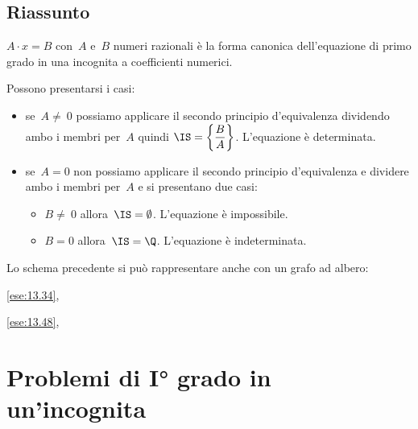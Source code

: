 \subsection{Riassunto}
\(A\cdot x=B\) con~\(A\) e~\(B\) numeri
razionali è la forma canonica dell'equazione di primo grado in una
incognita a coefficienti numerici.%

Possono presentarsi i casi:
\begin{itemize} [nosep]
 \item se~\(A\neq~0\) possiamo applicare il secondo principio
d'equivalenza dividendo ambo i membri per~\(A\) quindi
\(\IS =\left\{\dfrac{B}{A}\right\}\). L'equazione è determinata.
 \item se~\(A=0\) non possiamo applicare il secondo principio
d'equivalenza e dividere ambo i membri per~\(A\) e si
presentano due casi:
\begin{itemize} [nosep]
\item \(B\neq~0\) allora~\(\IS =\emptyset \). L'equazione è impossibile.
 \item \(B=0\) allora~\(\IS =\Q\). L'equazione è indeterminata.
\end{itemize}
\end{itemize}

Lo schema precedente si può rappresentare anche con un grafo ad
albero:
\begin{center}
%  
\alberoequazioni
\end{center}


\ref{ese:13.34}, 

\ref{ese:13.48}, 


\section{Problemi di I° grado in un'incognita}
\label{sec:equazioni_problemi}

